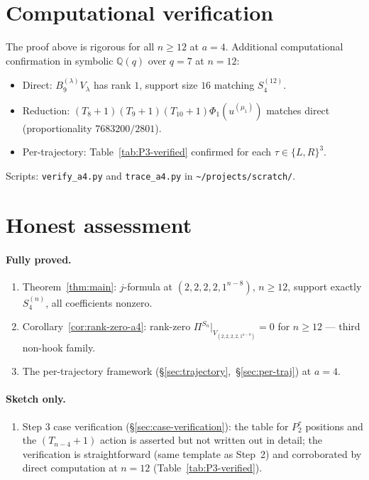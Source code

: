\documentclass[11pt]{article}
\theoremstyle{definition}
\begin{document}
\section{Computational verification}\label{sec:computation}

The proof above is rigorous for all $n\ge 12$ at $a=4$.  Additional
computational confirmation in symbolic $\mathbb{Q}(q)$ over $q=7$ at
$n=12$:
\begin{itemize}[leftmargin=2em,topsep=0.3em,itemsep=0.2em]
\item Direct: $B_9^{(\lambda)}V_\lambda$ has rank $1$, support size
$16$ matching $S_4^{(12)}$.
\item Reduction:
$(T_8{+}1)(T_9{+}1)(T_{10}{+}1)\Phi_1(u^{(\mu_1)})$ matches direct
(proportionality $7683200/2801$).
\item Per-trajectory:  Table~\ref{tab:P3-verified} confirmed for each
$\tau\in\{L,R\}^3$.
\end{itemize}
Scripts:
\texttt{verify\_a4.py} and \texttt{trace\_a4.py} in
\texttt{\textasciitilde/projects/scratch/}.

\section{Honest assessment}\label{sec:honest}

\paragraph{Fully proved.}
\begin{enumerate}[leftmargin=2em,topsep=0.3em,itemsep=0.2em]
\item Theorem~\ref{thm:main}: $j$-formula at $(2,2,2,2,1^{n-8})$,
$n\ge 12$, support exactly $S_4^{(n)}$, all coefficients nonzero.
\item Corollary~\ref{cor:rank-zero-a4}: rank-zero
$\Pi^{S_n}|_{V_{(2,2,2,2,1^{n-8})}}=0$ for $n\ge 12$ — third non-hook
family.
\item The per-trajectory framework
(\S\ref{sec:trajectory},~\S\ref{sec:per-traj}) at $a=4$.
\end{enumerate}

\paragraph{Sketch only.}
\begin{enumerate}[leftmargin=2em,topsep=0.3em,itemsep=0.2em]
\item Step 3 case verification (\S\ref{sec:case-verification}): the
table for $P_2^\tau$ positions and the $(T_{n-4}{+}1)$ action is
asserted but not written out in detail; the verification is
straightforward (same template as Step~2) and corroborated by
direct computation at $n=12$ (Table~\ref{tab:P3-verified}).
\end{enumerate}
\end{document}
